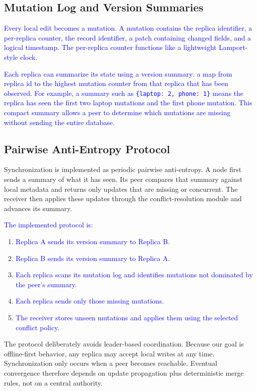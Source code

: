 \documentclass[10pt,twocolumn]{article}
\newcommand{\update}[1]{\textcolor{blue}{#1}}
\begin{document}
\subsection{Mutation Log and Version Summaries}

\update{Every local edit becomes a mutation. A mutation contains the replica identifier, a per-replica counter, the record identifier, a patch containing changed fields, and a logical timestamp. The per-replica counter functions like a lightweight Lamport-style clock.}

\update{Each replica can summarize its state using a version summary: a map from replica id to the highest mutation counter from that replica that has been observed. For example, a summary such as \texttt{\{laptop: 2, phone: 1\}} means the replica has seen the first two laptop mutations and the first phone mutation. This compact summary allows a peer to determine which mutations are missing without sending the entire database.}

\subsection{Pairwise Anti-Entropy Protocol}

Synchronization is implemented as periodic pairwise anti-entropy. A node first sends a summary of what it has seen. Its peer compares that summary against local metadata and returns only updates that are missing or concurrent. The receiver then applies these updates through the conflict-resolution module and advances its summary.

\update{The implemented protocol is:}

\begin{enumerate}[leftmargin=*]
    \item \update{Replica A sends its version summary to Replica B.}
    \item \update{Replica B sends its version summary to Replica A.}
    \item \update{Each replica scans its mutation log and identifies mutations not dominated by the peer's summary.}
    \item \update{Each replica sends only those missing mutations.}
    \item \update{The receiver stores unseen mutations and applies them using the selected conflict policy.}
\end{enumerate}

The protocol deliberately avoids leader-based coordination. Because our goal is offline-first behavior, any replica may accept local writes at any time. Synchronization only occurs when a peer becomes reachable. Eventual convergence therefore depends on update propagation plus deterministic merge rules, not on a central authority.
\end{document}
